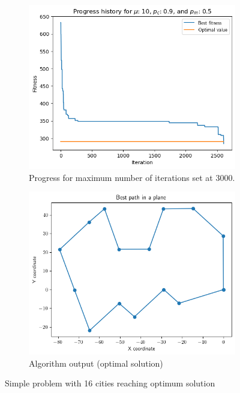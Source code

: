 \documentclass[10pt,a4paper]{article}
\begin{document}
\begin{figure}[h!]
    \centering
    \begin{subfigure}[b]{0.45\textwidth}
        \centering
        \includegraphics[width=\textwidth]{../figures/progress16.png}
        \caption{Progress for maximum number of iterations set at 3000.}
        \label{fig:progress16}
    \end{subfigure}
    \hfil
    \begin{subfigure}[b]{0.45\textwidth}
        \centering
        \includegraphics[width=\textwidth]{../figures/output16.png}
        \caption{Algorithm output (optimal solution)}
        \label{fig:output16}
    \end{subfigure}
    \caption{Simple problem with 16 cities reaching optimum solution}
    \label{fig:problem16}
\end{figure}
\end{document}
